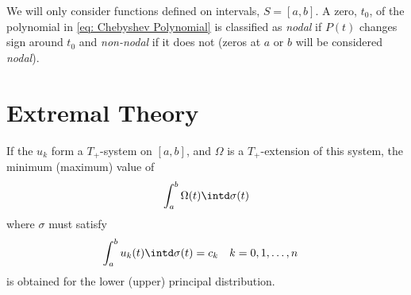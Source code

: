 We will only consider functions defined on intervals, $S = [a,b]$. A zero, $t_0$, of the polynomial in \eqref{eq: Chebyshev Polynomial} is classified as \emph{nodal} if $P(t)$ changes sign around $t_0$ and \emph{non-nodal} if it does not (zeros at $a$ or $b$ will be considered \emph{nodal}).




\section{Extremal Theory}
\begin{theorem}
	If the $u_k$ form a $T_+$-system on $[a,b]$, and $\Omega$ is a $T_+$-extension of this system, the minimum (maximum) value of 
	\begin{equation}
	\int_a^b \Omega (t) \intd \sigma(t)
	\end{equation}
	where $\sigma$ must satisfy
	\begin{align}
	\int_a^b u_k(t) \intd \sigma(t) &= c_k && k = 0,1,\dots,n
	\label{eq: Moment Constraints (thm Extremal Value)}
	\end{align}
	is obtained for the lower (upper) principal distribution.
	\label{thm: Extremal values of an integral}
\end{theorem}

